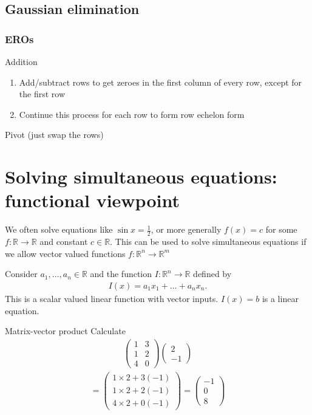 \documentclass{report}
\newcommand{\cvec}[1]{ \begin{pmatrix} #1 \end{pmatrix} }
\begin{document}
		\subsection{Gaussian elimination}
			
			\subsubsection{EROs}
				Addition
					\begin{enumerate}
						\item Add/subtract rows to get zeroes in the first column of every row, except for the first row
						\item Continue this process for each row to form row echelon form
					\end{enumerate}

				Pivot (just swap the rows)

	\section{Solving simultaneous equations: functional viewpoint}

		We often solve equations like $\sin x = \frac{1}{2}$, or more generally $f(x) = c$ for some $f: \mathbb{R} \to \mathbb{R}$ and constant $c \in \mathbb{R}$. This can be used to solve simultaneous equations if we allow vector valued functions $f:\mathbb{R}^n \to \mathbb{R}^m$

		Consider $a_1,\dots,a_n \in \mathbb{R}$ and the function $I: \mathbb{R}^n \to \mathbb{R}$ defined by
		\begin{align*}
			I(x) = a_1x_1 + \dots + a_nx_n.
		\end{align*}
		This is a scalar valued linear function with vector inputs. $I(x) = b$ is a linear equation.

		\begin{question}{Matrix-vector product}
			Calculate
			\begin{align*}
			\begin{pmatrix}
				1 & 3	\\
				1 & 2	\\
				4 & 0	
			\end{pmatrix}
			\cvec{2\\-1}
			\end{align*}
			\begin{align*}
				= \cvec{1 \times 2 + 3(-1) \\ 1 \times 2 + 2(-1) \\ 4 \times 2 + 0(-1)} = \cvec{-1\\0\\8}
			\end{align*}
		\end{question}
\end{document}
